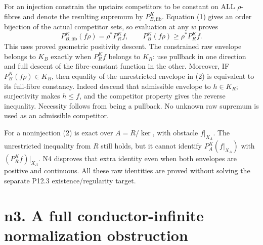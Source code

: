 For an injection constrain the upstairs competitors to be constant on ALL $\rho$-fibres and denote the resulting supremum by $P_{B,\mathrm{fib}}^K$. Equation (1) gives an order bijection of the actual competitor sets, so evaluation at any $w$ proves
\[
 P_{B,\mathrm{fib}}^K(f\rho)=\rho^*P_R^Kf,\qquad
 P_B^K(f\rho)\ge\rho^*P_R^Kf. \tag{2}
\]
This uses proved geometric positivity descent. The constrained raw envelope belongs to $K_B$ exactly when $P_R^Kf$ belongs to $K_R$: use pullback in one direction and full descent of the fibre-constant function in the other. Moreover, IF $P_B^K(f\rho)\in K_B$, then equality of the unrestricted envelope in (2) is equivalent to its full-fibre constancy. Indeed descend that admissible envelope to $h\in K_R$; surjectivity makes $h\le f$, and the competitor property gives the reverse inequality. Necessity follows from being a pullback. No unknown raw supremum is used as an admissible competitor.

For a noninjection (2) is exact over $A=R/\ker$, with obstacle $f|_{X_A}$. The unrestricted inequality from $R$ still holds, but it cannot identify $P_A^K(f|_{X_A})$ with $(P_R^Kf)|_{X_A}$. N4 disproves that extra identity even when both envelopes are positive and continuous. All these raw identities are proved without solving the separate P12.3 existence/regularity target.


\section{n3. A full conductor-infinite normalization obstruction}

